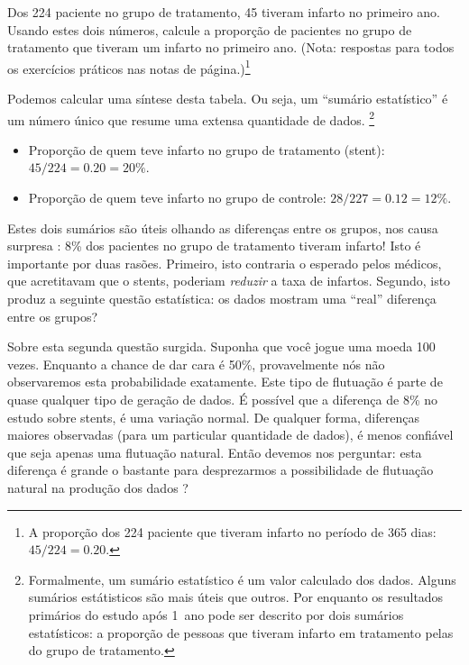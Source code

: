 \begin{exercise}
Dos 224 paciente no grupo de tratamento, 45 tiveram infarto no primeiro ano. Usando estes dois números, calcule a proporção de pacientes no grupo de tratamento que tiveram um
    infarto no primeiro ano. (Nota: respostas para todos os exercícios práticos nas notas de página.)\footnote{A proporção dos 224 paciente que tiveram infarto no período de 365 dias: $45/224 = 0.20$.}
\end{exercise}

Podemos calcular uma síntese desta tabela. Ou seja, um ``sumário estatístico'' é um número único que resume uma extensa quantidade de dados. \footnote{Formalmente, um sumário estatístico é um valor calculado dos dados. Alguns sumários estátisticos são mais úteis que outros. Por enquanto os resultados primários do estudo após 1~ano pode ser descrito por dois sumários estatísticos: a proporção de pessoas que tiveram infarto em tratamento pelas do grupo de tratamento.}

\begin{itemize}
\setlength{\itemsep}{0mm}
\item[] Proporção de quem teve infarto no grupo de tratamento (stent): $45/224 = 0.20 = 20\%$.
\item[] Proporção de quem teve infarto no grupo de controle: $28/227 = 0.12 = 12\%$.
\end{itemize}

Estes dois sumários são úteis olhando as diferenças entre os grupos, nos causa surpresa : 8\% dos pacientes no grupo de tratamento tiveram infarto! Isto é importante por duas rasões. Primeiro, isto contraria o esperado pelos médicos, que acretitavam que o stents, poderiam \emph{reduzir} a taxa de infartos. Segundo, isto produz a seguinte questão estatística: os dados mostram uma ``real'' diferença entre os grupos?

Sobre esta segunda questão surgida. Suponha que você jogue uma moeda 100 vezes. Enquanto a chance de dar cara é 50\%, provavelmente nós não observaremos esta probabilidade exatamente. Este tipo de flutuação é parte de quase qualquer tipo de geração de dados. É possível que a diferença de 8\% no estudo sobre stents, é uma variação normal. De qualquer forma, diferenças maiores observadas (para um particular quantidade de dados), é menos confiável que seja apenas uma flutuação natural. Então devemos nos perguntar: esta diferença é grande o bastante para desprezarmos a possibilidade de flutuação natural na produção dos dados ?


